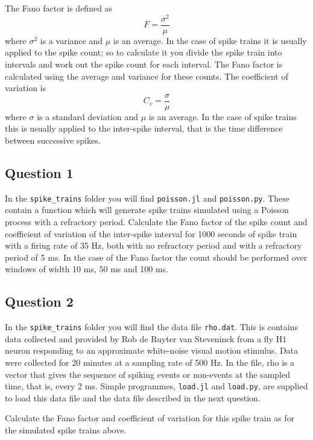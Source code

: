\documentclass[12pt]{article}
\begin{document}
The Fano factor is defined as
\begin{equation}
F=\frac{\sigma^2}{\mu}
\end{equation}
where $\sigma^2$ is a variance and $\mu$ is an average.  In the
case of spike trains it is usually applied to the spike count; so to
calculate it you divide the spike train into intervals and work out
the spike count for each interval. The Fano factor is calculated using
the average and variance for these counts. The coefficient of variation is 
\begin{equation}
C_v=\frac{\sigma}{\mu}
\end{equation}
where $\sigma$ is a standard deviation and $\mu$ is an average. In the
case of spike trains this is usually applied to the inter-spike
interval, that is the time difference between successive spikes.

\subsection*{Question 1}

In the \texttt{spike\_trains} folder you will find
\texttt{poisson.jl} and \texttt{poisson.py}. These contain a function
which will generate spike trains simulated using a Poisson process
with a refractory period. Calculate the Fano factor of the spike count
and coefficient of variation of the inter-spike interval for 1000
seconds of spike train with a firing rate of 35 Hz, both with no
refractory period and with a refractory period of 5 ms. In the case of
the Fano factor the count should be performed over windows of width 10
ms, 50 ms and 100 ms.

\subsection*{Question 2}

In the \texttt{spike\_trains} folder you will find the data file
\texttt{rho.dat}. This is contains data collected and provided by Rob
de Ruyter van Steveninck from a fly H1 neuron responding to an
approximate white-noise visual motion stimulus. Data were collected
for 20 minutes at a sampling rate of 500 Hz. In the file, rho is a
vector that gives the sequence of spiking events or non-events at the
sampled time, that is, every 2 ms. Simple programmes, \texttt{load.jl}
and \texttt{load.py}, are supplied to load this data file and the data
file described in the next question.

Calculate the Fano factor and coefficient of variation for this spike
train as for the simulated spike trains above.
\end{document}

